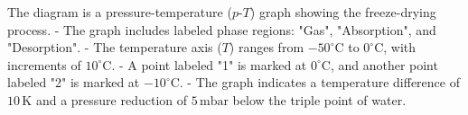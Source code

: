 The diagram is a pressure-temperature (\( p \)-\( T \)) graph showing the freeze-drying process.  
- The graph includes labeled phase regions: "Gas", "Absorption", and "Desorption".  
- The temperature axis (\( T \)) ranges from \(-50^\circ\text{C}\) to \( 0^\circ\text{C}\), with increments of \( 10^\circ\text{C} \).  
- A point labeled "1" is marked at \( 0^\circ\text{C} \), and another point labeled "2" is marked at \(-10^\circ\text{C}\).  
- The graph indicates a temperature difference of \( 10 \, \text{K} \) and a pressure reduction of \( 5 \, \text{mbar} \) below the triple point of water.